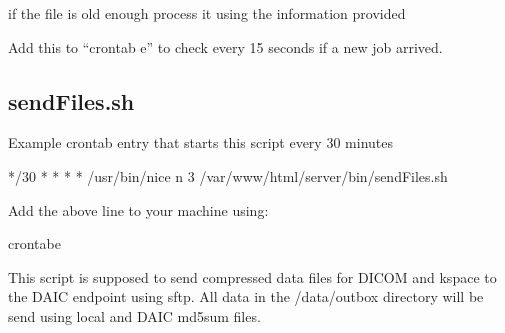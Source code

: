 \documentclass[letterpaper,10pt,english]{sphinxmanual}
\begin{document}
\sphinxAtStartPar
if the file is old enough process it using the information provided

\sphinxAtStartPar
Add this to “crontab \sphinxhyphen{}e” to check every 15 seconds if a new job arrived.

\sphinxAtStartPar
{}

\sphinxAtStartPar
{}

\sphinxAtStartPar
{}

\sphinxAtStartPar
{}

\sphinxAtStartPar
{}

\sphinxAtStartPar
{}

\sphinxAtStartPar
{}

\sphinxstepscope


\subsection{sendFiles.sh}
\label{\detokenize{Architecture/scripts/sendFiles:sendfiles-sh}}\label{\detokenize{Architecture/scripts/sendFiles::doc}}
\sphinxAtStartPar
Example crontab entry that starts this script every 30 minutes

\begin{sphinxVerbatim}[commandchars=\\\{\}]
*/30 * * * * /usr/bin/nice \PYGZhy{}n 3 /var/www/html/server/bin/sendFiles.sh
\end{sphinxVerbatim}

\sphinxAtStartPar
Add the above line to your machine using:

\begin{sphinxVerbatim}[commandchars=\\\{\}]
\PYGZgt{}crontab\PYGZhy{}e
\end{sphinxVerbatim}

\sphinxAtStartPar
This script is supposed to send compressed data files for DICOM and k\sphinxhyphen{}space to the DAIC endpoint using sftp. All data in the /data/outbox directory will be send using local and DAIC md5sum files.
\end{document}
